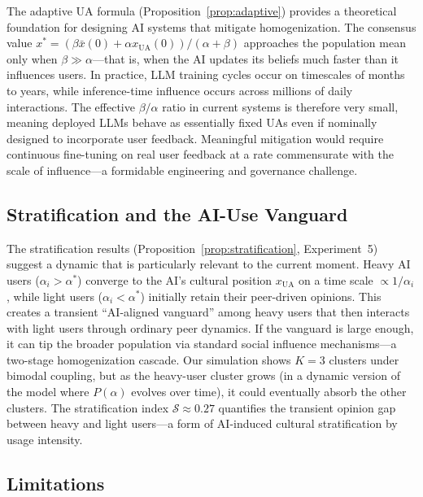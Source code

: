 \documentclass{article}
\theoremstyle{plain}
\theoremstyle{definition}
\theoremstyle{remark}
\newcommand{\xUA}{x_{\mathrm{UA}}}
\newcommand{\xbar}{\bar{x}}
\begin{document}
The adaptive UA formula (Proposition~\ref{prop:adaptive}) provides a
theoretical foundation for designing AI systems that mitigate homogenization.
The consensus value $x^*=(\beta\xbar(0)+\alpha\xUA(0))/(\alpha+\beta)$
approaches the population mean only when $\beta\gg\alpha$---that is,
when the AI updates its beliefs much faster than it influences users.
In practice, LLM training cycles occur on timescales of months to years,
while inference-time influence occurs across millions of daily interactions.
The effective $\beta/\alpha$ ratio in current systems is therefore very small,
meaning deployed LLMs behave as essentially fixed UAs even if nominally
designed to incorporate user feedback.
Meaningful mitigation would require continuous fine-tuning on real user
feedback at a rate commensurate with the scale of influence---a formidable
engineering and governance challenge.

\subsection{Stratification and the AI-Use Vanguard}

The stratification results (Proposition~\ref{prop:stratification},
Experiment~5) suggest a dynamic that is particularly relevant to
the current moment.
Heavy AI users ($\alpha_i>\alpha^*$) converge to the AI's cultural
position $\xUA$ on a time scale $\propto 1/\alpha_i$, while light
users ($\alpha_i<\alpha^*$) initially retain their peer-driven opinions.
This creates a transient ``AI-aligned vanguard'' among heavy users
that then interacts with light users through ordinary peer dynamics.
If the vanguard is large enough, it can tip the broader population via
standard social influence mechanisms---a two-stage homogenization cascade.
Our simulation shows $K=3$ clusters under bimodal coupling, but as the
heavy-user cluster grows (in a dynamic version of the model where
$P(\alpha)$ evolves over time), it could eventually absorb the other clusters.
The stratification index $\mathcal{S}\approx 0.27$ quantifies the transient
opinion gap between heavy and light users---a form of AI-induced cultural
stratification by usage intensity.

\subsection{Limitations}
\end{document}

